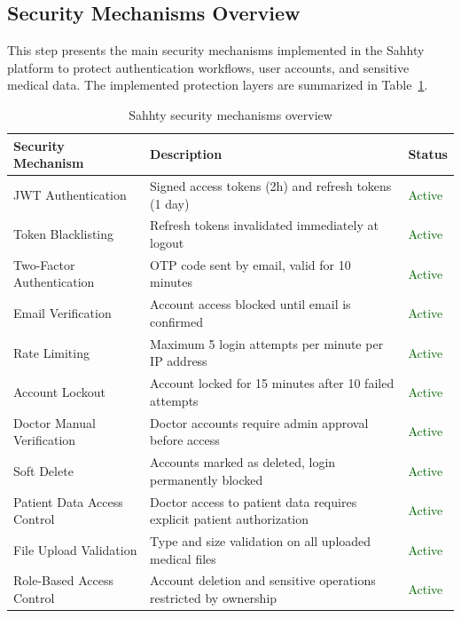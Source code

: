 \subsection{Security Mechanisms Overview}
This step presents the main security mechanisms implemented in the Sahhty platform to protect authentication workflows, user accounts, and sensitive medical data. The implemented protection layers are summarized in Table~\ref{tab:security_summary}.
\begin{table}[H]
\centering
\caption{Sahhty security mechanisms overview}
\label{tab:security_summary}
\renewcommand{\arraystretch}{1.3}
\begin{tabular}{|p{5cm}|p{8cm}|p{1.4cm}|}
\hline
\rowcolor{red!10}
\textbf{Security Mechanism} & \textbf{Description} & \textbf{Status} \\
\hline
JWT Authentication & Signed access tokens (2h) and refresh tokens (1 day) & \textcolor{darkgreen}{Active} \\
\hline
Token Blacklisting & Refresh tokens invalidated immediately at logout & \textcolor{darkgreen}{Active} \\
\hline
Two-Factor Authentication & OTP code sent by email, valid for 10 minutes & \textcolor{darkgreen}{Active} \\
\hline
Email Verification & Account access blocked until email is confirmed & \textcolor{darkgreen}{Active} \\
\hline
Rate Limiting & Maximum 5 login attempts per minute per IP address & \textcolor{darkgreen}{Active} \\
\hline
Account Lockout & Account locked for 15 minutes after 10 failed attempts & \textcolor{darkgreen}{Active} \\
\hline
Doctor Manual Verification & Doctor accounts require admin approval before access & \textcolor{darkgreen}{Active} \\
\hline
Soft Delete & Accounts marked as deleted, login permanently blocked & \textcolor{darkgreen}{Active} \\
\hline
Patient Data Access Control & Doctor access to patient data requires explicit patient authorization & \textcolor{darkgreen}{Active} \\
\hline
File Upload Validation & Type and size validation on all uploaded medical files & \textcolor{darkgreen}{Active} \\
\hline
Role-Based Access Control & Account deletion and sensitive operations restricted by ownership & \textcolor{darkgreen}{Active} \\
\hline
\end{tabular}
\end{table}

